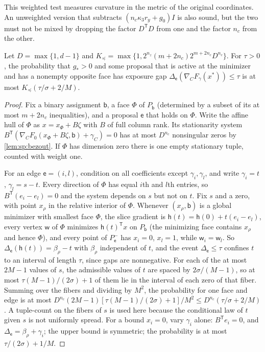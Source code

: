 This weighted test measures curvature in the metric of the original
coordinates. An unweighted version that subtracts $(n_c\kappa_3r_y+g_0)I$ is
also sound, but the two must not be mixed by dropping the factor $D^{\mathsf
T}D$ from one and the factor $n_c$ from the other.

\begin{lemma}\label{lem:con:order-tail}
Let $D=\max\{1,d-1\}$ and
$K_\preceq=\max\{1,2^{n_z}(m+2n_c)2^{m+2n_c}D^{n_c}\}$. For $\tau>0$, the
probability that $g_*>0$ and some proposal that is active at the minimizer and
has a nonempty opposite face has exposure gap
$\Delta_{\mathsf e}(\nabla_CF_\gamma(x^*))\le\tau$ is at most
$K_\preceq(\tau/\sigma+2/M)$.
\end{lemma}

\begin{proof}
Fix a binary assignment $\mathsf b$, a face $\Phi$ of $P_{\mathsf b}$ (determined
by a subset of its at most $m+2n_c$ inequalities), and a proposal $\mathsf e$
that holds on $\Phi$. Write the affine hull of $\Phi$ as $x=x_\Phi+B\zeta$ with
$B$ of full column rank. Its stationarity system
$B^{\mathsf T}(\nabla_CF_0(x_\Phi+B\zeta,\mathsf b)+\gamma_C)=0$ has at most
$D^{n_c}$ nonsingular zeros by \cref{lem:sp:bezout}. If $\Phi$ has dimension
zero there is one empty stationary tuple, counted with weight one.

For an edge $\mathsf e=(i,l)$, condition on all coefficients except
$\gamma_i,\gamma_l$, and write $\gamma_i=t$, $\gamma_l=s-t$. Every direction of
$\Phi$ has equal $i$th and $l$th entries, so $B^{\mathsf T}(e_i-e_l)=0$ and the
system depends on $s$ but not on $t$. Fix $s$ and a zero, with point
$x_\rho$ in the relative interior of $\Phi$. Whenever $(x_\rho,\mathsf b)$ is a
global minimizer with smallest face $\Phi$, the slice gradient is
$\mathsf h(t)=\mathsf h(0)+t(e_i-e_l)$, every vertex $\mathsf w$ of $\Phi$
minimizes $\mathsf h(t)^{\mathsf T}x$ on $P_{\mathsf b}$ (the minimizing face contains
$x_\rho$ and hence $\Phi$), and every point of $P_{\mathsf e}^-$ has $x_i=0$,
$x_l=1$, while $\mathsf w_i=\mathsf w_l$. So
$\Delta_{\mathsf e}(\mathsf h(t))=\beta_\rho-t$ with $\beta_\rho$ independent of
$t$, and the event $\Delta_{\mathsf e}\le\tau$ confines $t$ to an interval of
length $\tau$, since gaps are nonnegative. For each of the at most $2M-1$
values of $s$, the admissible values of $t$ are spaced by $2\sigma/(M-1)$, so
at most $\tau(M-1)/(2\sigma)+1$ of them lie in the interval of each zero of
that fiber. Summing over the fibers and dividing by $M^2$, the probability for
one face and edge is at most
$D^{n_c}(2M-1)[\tau(M-1)/(2\sigma)+1]/M^2\le D^{n_c}(\tau/\sigma+2/M)$. A tuple-count on the
fibers of $s$ is used here because the conditional law of $t$ given $s$ is not
uniformly spread. For a bound $x_i=0$, vary $\gamma_i$ alone: $B^{\mathsf
T}e_i=0$, and $\Delta_{\mathsf e}=\beta_\rho+\gamma_i$; the upper bound is
symmetric; the probability is at most $\tau/(2\sigma)+1/M$.


\end{proof}
